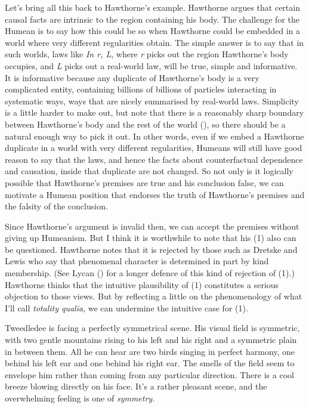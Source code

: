 \documentclass[
  11pt,
  letterpaper,
  DIV=11,
  numbers=noendperiod,
  twoside]{scrartcl}
\begin{document}
Let's bring all this back to Hawthorne's example. Hawthorne argues that
certain causal facts are intrinsic to the region containing his body.
The challenge for the Humean is to say how this could be so when
Hawthorne could be embedded in a world where very different regularities
obtain. The simple answer is to say that in such worlds, laws like
\emph{In r, L}, where \emph{r} picks out the region Hawthorne's body
occupies, and \emph{L} picks out a real-world law, will be true, simple
and informative. It is informative because any duplicate of Hawthorne's
body is a very complicated entity, containing billions of billions of
particles interacting in systematic ways, ways that are nicely
summarised by real-world laws. Simplicity is a little harder to make
out, but note that there is a reasonably sharp boundary between
Hawthorne's body and the rest of the world
(), so there should be a natural
enough way to pick it out. In other words, even if we embed a Hawthorne
duplicate in a world with very different regularities, Humeans will
still have good reason to say that the laws, and hence the facts about
counterfactual dependence and causation, inside that duplicate are not
changed. So not only is it logically possible that Hawthorne's premises
are true and his conclusion false, we can motivate a Humean position
that endorses the truth of Hawthorne's premises and the falsity of the
conclusion.

Since Hawthorne's argument is invalid then, we can accept the premises
without giving up Humeanism. But I think it is worthwhile to note that
his (1) also can be questioned. Hawthorne notes that it is rejected by
those such as Dretske and Lewis who say that phenomenal character is
determined in part by kind membership. (See Lycan
() for a longer defence of this kind of
rejection of (1).) Hawthorne thinks that the intuitive plausibility of
(1) constitutes a serious objection to those views. But by reflecting a
little on the phenomenology of what I'll call \emph{totality qualia}, we
can undermine the intuitive case for (1).

Tweedledee is facing a perfectly symmetrical scene. His visual field is
symmetric, with two gentle mountains rising to his left and his right
and a symmetric plain in between them. All he can hear are two birds
singing in perfect harmony, one behind his left ear and one behind his
right ear. The smells of the field seem to envelope him rather than
coming from any particular direction. There is a cool breeze blowing
directly on his face. It's a rather pleasant scene, and the overwhelming
feeling is one of \emph{symmetry}.
\end{document}
